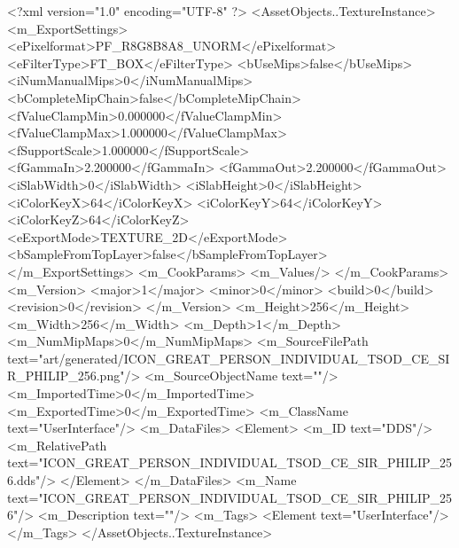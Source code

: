 <?xml version="1.0" encoding="UTF-8" ?>
<AssetObjects..TextureInstance>
	<m_ExportSettings>
		<ePixelformat>PF_R8G8B8A8_UNORM</ePixelformat>
		<eFilterType>FT_BOX</eFilterType>
		<bUseMips>false</bUseMips>
		<iNumManualMips>0</iNumManualMips>
		<bCompleteMipChain>false</bCompleteMipChain>
		<fValueClampMin>0.000000</fValueClampMin>
		<fValueClampMax>1.000000</fValueClampMax>
		<fSupportScale>1.000000</fSupportScale>
		<fGammaIn>2.200000</fGammaIn>
		<fGammaOut>2.200000</fGammaOut>
		<iSlabWidth>0</iSlabWidth>
		<iSlabHeight>0</iSlabHeight>
		<iColorKeyX>64</iColorKeyX>
		<iColorKeyY>64</iColorKeyY>
		<iColorKeyZ>64</iColorKeyZ>
		<eExportMode>TEXTURE_2D</eExportMode>
		<bSampleFromTopLayer>false</bSampleFromTopLayer>
	</m_ExportSettings>
	<m_CookParams>
		<m_Values/>
	</m_CookParams>
	<m_Version>
		<major>1</major>
		<minor>0</minor>
		<build>0</build>
		<revision>0</revision>
	</m_Version>
	<m_Height>256</m_Height>
	<m_Width>256</m_Width>
	<m_Depth>1</m_Depth>
	<m_NumMipMaps>0</m_NumMipMaps>
	<m_SourceFilePath text="art/generated/ICON_GREAT_PERSON_INDIVIDUAL_TSOD_CE_SIR_PHILIP_256.png"/>
	<m_SourceObjectName text=""/>
	<m_ImportedTime>0</m_ImportedTime>
	<m_ExportedTime>0</m_ExportedTime>
	<m_ClassName text="UserInterface"/>
	<m_DataFiles>
		<Element>
			<m_ID text="DDS"/>
			<m_RelativePath text="ICON_GREAT_PERSON_INDIVIDUAL_TSOD_CE_SIR_PHILIP_256.dds"/>
		</Element>
	</m_DataFiles>
	<m_Name text="ICON_GREAT_PERSON_INDIVIDUAL_TSOD_CE_SIR_PHILIP_256"/>
	<m_Description text=""/>
	<m_Tags>
		<Element text="UserInterface"/>
	</m_Tags>
</AssetObjects..TextureInstance>
